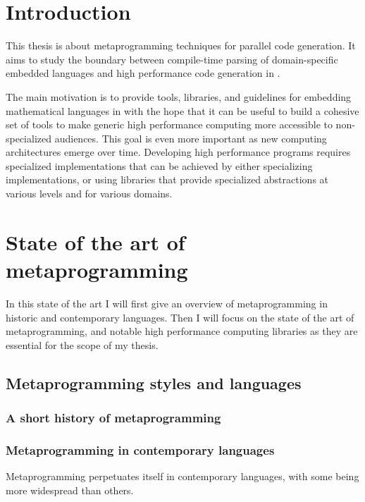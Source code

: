 \documentclass[../main]{subfiles}
\begin{document}

\chapter{Introduction}

This thesis is about metaprogramming techniques for parallel code generation.
It aims to study the boundary between compile-time parsing of
domain-specific embedded languages and high performance code generation in \cpp.

The main motivation is to provide tools, libraries, and guidelines for embedding
mathematical languages in \cpp with the hope that it can be useful to build a
cohesive set of tools to make generic high performance computing more accessible
to non-specialized audiences. This goal is even more important as new computing
architectures emerge over time. Developing high performance programs requires
specialized implementations that can be achieved by either specializing
implementations, or using libraries that provide specialized abstractions at
various levels and for various domains.

\chapter{State of the art of metaprogramming}

In this state of the art I will first give an overview of metaprogramming in
historic and contemporary languages. Then I will focus on the state of the art
of \cpp metaprogramming, and notable high performance computing libraries as they
are essential for the scope of my thesis.

\section{Metaprogramming styles and languages}

\subsection{A short history of metaprogramming}

\subsection{Metaprogramming in contemporary languages}

Metaprogramming perpetuates itself in contemporary languages,
with some being more widespread than others.
\end{document}
